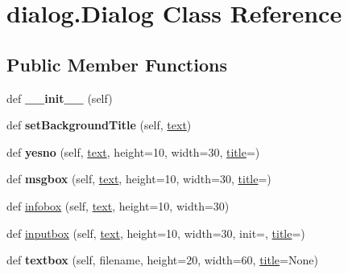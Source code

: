 \hypertarget{classdialog_1_1_dialog}{}\section{dialog.\+Dialog Class Reference}
\label{classdialog_1_1_dialog}
\subsection*{Public Member Functions}
\begin{DoxyCompactItemize}
\item 
def {\bfseries \+\_\+\+\_\+init\+\_\+\+\_\+} (self)\hypertarget{classdialog_1_1_dialog_a8c49d301c4732bb77440e29b2bea5d06}{}\label{classdialog_1_1_dialog_a8c49d301c4732bb77440e29b2bea5d06}

\item 
def {\bfseries set\+Background\+Title} (self, \hyperlink{classdialog_1_1_dialog_ac6496479083764dc18d577e5becfa467}{text})\hypertarget{classdialog_1_1_dialog_a6d13d1c77d79703658a09c7d8d0c45ae}{}\label{classdialog_1_1_dialog_a6d13d1c77d79703658a09c7d8d0c45ae}

\item 
def {\bfseries yesno} (self, \hyperlink{classdialog_1_1_dialog_ac6496479083764dc18d577e5becfa467}{text}, height=10, width=30, \hyperlink{classdialog_1_1_dialog_a0ba5ed1f2029a13c537ea89ace62176a}{title}=\textquotesingle{}\textquotesingle{})\hypertarget{classdialog_1_1_dialog_a72298227b850628504fc23b311319e03}{}\label{classdialog_1_1_dialog_a72298227b850628504fc23b311319e03}

\item 
def {\bfseries msgbox} (self, \hyperlink{classdialog_1_1_dialog_ac6496479083764dc18d577e5becfa467}{text}, height=10, width=30, \hyperlink{classdialog_1_1_dialog_a0ba5ed1f2029a13c537ea89ace62176a}{title}=\textquotesingle{}\textquotesingle{})\hypertarget{classdialog_1_1_dialog_a4c7491708cc3768c4cf005a988112887}{}\label{classdialog_1_1_dialog_a4c7491708cc3768c4cf005a988112887}

\item 
def \hyperlink{classdialog_1_1_dialog_a0c632f1d4717079068f29361163800a9}{infobox} (self, \hyperlink{classdialog_1_1_dialog_ac6496479083764dc18d577e5becfa467}{text}, height=10, width=30)
\item 
def \hyperlink{classdialog_1_1_dialog_a785c83eb7004696d15edfe8bc91ad420}{inputbox} (self, \hyperlink{classdialog_1_1_dialog_ac6496479083764dc18d577e5becfa467}{text}, height=10, width=30, init=\textquotesingle{}\textquotesingle{}, \hyperlink{classdialog_1_1_dialog_a0ba5ed1f2029a13c537ea89ace62176a}{title}=\textquotesingle{}\textquotesingle{})
\item 
def {\bfseries textbox} (self, filename, height=20, width=60, \hyperlink{classdialog_1_1_dialog_a0ba5ed1f2029a13c537ea89ace62176a}{title}=None)\hypertarget{classdialog_1_1_dialog_a7f781f4e1b19d95ed218af50e146a15c}{}\label{classdialog_1_1_dialog_a7f781f4e1b19d95ed218af50e146a15c}


\end{DoxyCompactItemize}
